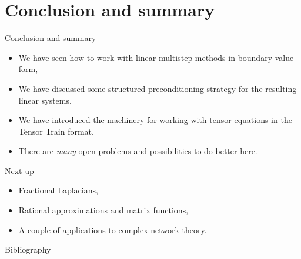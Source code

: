 \documentclass[aspectratio=169,xcolor=dvipsnames]{beamer}
\newcommand\unnumbered{\setbeamertemplate{footline}{}}%
\begin{document}
\section{Conclusion and summary}

\begin{frame}{Conclusion and summary}
	
	\begin{itemize}
		\item[\textcolor{success}{\faCheckCircle}] We have seen how to work with linear multistep methods in boundary value form,
		\item[\textcolor{success}{\faCheckCircle}] We have discussed some structured preconditioning strategy for the resulting linear systems,
		\item[\textcolor{success}{\faCheckCircle}] We have introduced the machinery for working with tensor equations in the Tensor Train format.
		\item[\faBinoculars] There are \emph{many} open problems and possibilities to do better here.
	\end{itemize}
	\vfill
	
	Next up
	\begin{itemize}
		\item[\textcolor{todo}{\faClipboardList}] Fractional Laplacians,
		\item[\textcolor{todo}{\faClipboardList}] Rational approximations and matrix functions,
		\item[\textcolor{todo}{\faClipboardList}] A couple of applications to complex network theory.
	\end{itemize}
	
\end{frame}

	{\unnumbered
		\begin{frame}{Bibliography}
			\small
			\printbibliography
			
		\end{frame}
	}
\end{document}
